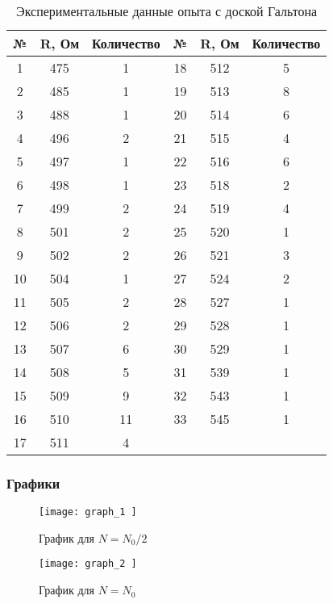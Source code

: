 \begin{center}
	\begin{longtable}{|c|c|c||c|c|c|}
		\caption[Экспериментальные данные опыта с доской Гальтона]{Экспериментальные данные опыта с доской Гальтона} \label{ap:table:3} \\
		\hline
		\multicolumn{1}{|c|}{\textbf{№}} &
		\multicolumn{1}{c|}{\textbf{R, Ом}} & 
		\multicolumn{1}{c||}{\textbf{Количество}} &
		\multicolumn{1}{c|}{\textbf{№}} &
		\multicolumn{1}{c|}{\textbf{R, Ом}} & 
		\multicolumn{1}{c|}{\textbf{Количество}} \\ \hline
		\endfirsthead
		
		1  & 475 & 1  & 18 & 512 & 5 \\ \hline
		2  & 485 & 1  & 19 & 513 & 8 \\ \hline
		3  & 488 & 1  & 20 & 514 & 6 \\ \hline
		4  & 496 & 2  & 21 & 515 & 4 \\ \hline
		5  & 497 & 1  & 22 & 516 & 6 \\ \hline
		6  & 498 & 1  & 23 & 518 & 2 \\ \hline
		7  & 499 & 2  & 24 & 519 & 4 \\ \hline
		8  & 501 & 2  & 25 & 520 & 1 \\ \hline
		9  & 502 & 2  & 26 & 521 & 3 \\ \hline
		10 & 504 & 1  & 27 & 524 & 2 \\ \hline
		11 & 505 & 2  & 28 & 527 & 1 \\ \hline
		12 & 506 & 2  & 29 & 528 & 1 \\ \hline
		13 & 507 & 6  & 30 & 529 & 1 \\ \hline
		14 & 508 & 5  & 31 & 539 & 1 \\ \hline
		15 & 509 & 9  & 32 & 543 & 1 \\ \hline
		16 & 510 & 11 & 33 & 545 & 1 \\ \hline
		17 & 511 & 4  &    &     &   \\ \hline
		
		
	\end{longtable}
\end{center}

\newpage

\subsubsection{Графики} \label{pril_practic_graph}

\begin{figure} [H]
	\centering
	\texttt{[image:  graph\_1 ]} \label{graph-1}
	\caption{График для $N = N_0/2$}
\end{figure}

\begin{figure}[H] \label{image_2}
	\centering
	\texttt{[image:  graph\_2 ]} \label{graph-2}
	\caption{График для $N = N_0$}
\end{figure}